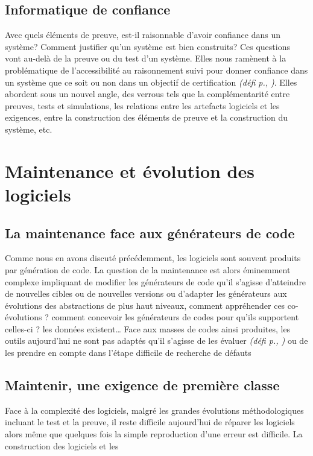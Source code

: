 \documentclass[11pt]{article}
\newcommand{\defi}[1]{\emph{(défi p.\pageref{#1}, \cite{#1})}}
\begin{document}
\subsection{Informatique de confiance}
Avec quels éléments de preuve, est-il raisonnable d'avoir confiance dans un système? Comment justifier qu'un système est bien construits? Ces questions vont au-delà de la preuve ou du test d'un système. Elles nous ramènent à  la problématique de l'accessibilité au raisonnement suivi pour donner confiance dans un système que ce soit ou non dans un objectif de certification \defi{argumentation}. 
Elles abordent sous un nouvel angle, des verrous tels que la 
complémentarité entre preuves, tests et simulations, les relations entre les artefacts logiciels et les exigences, entre la construction des éléments de preuve et la construction du système, etc. 

\section{Maintenance et évolution des logiciels}

\subsection{La maintenance face aux générateurs de code}
Comme nous en avons discuté précédemment, les logiciels sont souvent produits par génération de code. La question de la maintenance est alors éminemment complexe impliquant de modifier les générateurs de code qu'il s'agisse d'atteindre de nouvelles cibles ou de nouvelles versions ou d'adapter les générateurs aux évolutions des abstractions de plus haut niveaux, comment appréhender ces co-évolutions ? comment concevoir les générateurs de codes pour qu'ils supportent celles-ci ? les données existent… 
Face aux masses de codes ainsi produites, les outils aujourd'hui ne sont pas adaptés qu'il s'agisse de les évaluer \defi{coevolution} ou de les prendre en compte dans l'étape difficile de recherche de défauts \cite{debugger}

\subsection{Maintenir, une exigence de première classe}
Face à la complexité des logiciels, malgré les grandes évolutions méthodologiques incluant le test et la preuve, il reste difficile aujourd'hui de réparer les logiciels alors même que quelques fois la simple reproduction d'une erreur est difficile. La construction des logiciels et les 
\end{document}
